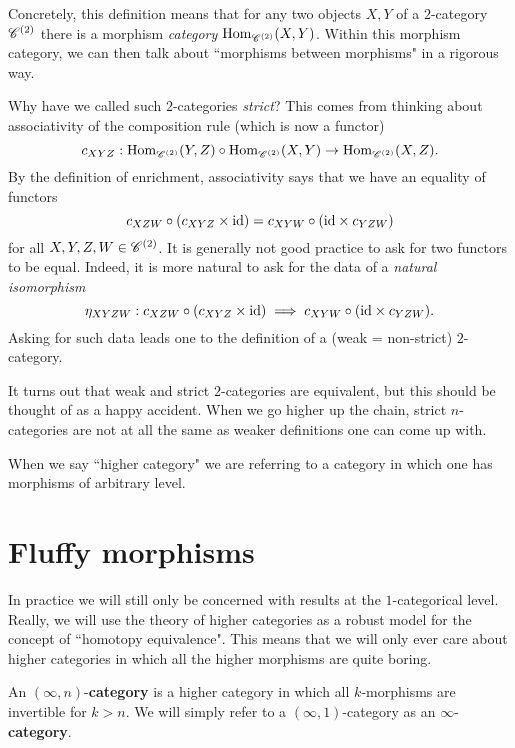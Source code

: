 \documentclass[11pt]{amsart}
\begin{document}
Concretely, this definition means that for any two objects $X,Y$ of a $2$-category $\mathscr C^{(2)}$ there is a morphism {\em category} ${\rm Hom}_{\mathscr C^{(2)}}(X,Y)$. 
Within this morphism category, we can then talk about ``morphisms between morphisms" in a rigorous way. 

Why have we called such $2$-categories {\em strict}?
This comes from thinking about associativity of the composition rule (which is now a functor)
\[
c_{XYZ} : {\rm Hom}_{\mathscr C^{(2)}}(Y,Z) \circ {\rm Hom}_{\mathscr C^{(2)}}(X,Y) \to {\rm Hom}_{\mathscr C^{(2)}}(X,Z) .
\]
By the definition of enrichment, associativity says that we have an equality of functors
\[
c_{XZW} \circ (c_{XYZ} \times {\rm id}) = c_{XYW} \circ ({\rm id} \times c_{YZW})
\]
for all $X,Y,Z,W \in \mathscr C^{(2)}$. 
It is generally not good practice to ask for two functors to be equal. 
Indeed, it is more natural to ask for the data of a {\em natural isomorphism}
\[
\eta_{XYZW} : c_{XZW} \circ (c_{XYZ} \times {\rm id}) \implies c_{XYW} \circ ({\rm id} \times c_{YZW}) .
\]
Asking for such data leads one to the definition of a (weak = non-strict) $2$-category.

\begin{rmk}
It turns out that weak and strict $2$-categories are equivalent, but this should be thought of as a happy accident.
When we go higher up the chain, strict $n$-categories are not at all the same as weaker definitions one can come up with.
\end{rmk}

When we say ``higher category" we are referring to a category in which one has morphisms of arbitrary level. 

\section{Fluffy morphisms}

In practice we will still only be concerned with results at the $1$-categorical level. 
Really, we will use the theory of higher categories as a robust model for the concept of ``homotopy equivalence". 
This means that we will only ever care about higher categories in which all the higher morphisms are quite boring. 

\begin{dfn}
An $(\infty,n)$-{\bf category} is a higher category in which all $k$-morphisms are invertible for $k > n$. 
We will simply refer to a $(\infty,1)$-category as an $\infty$-{\bf category}.
\end{dfn}  
\end{document}
